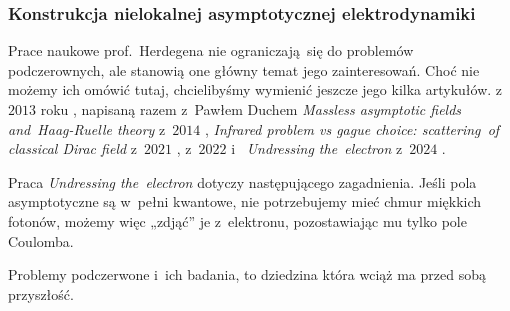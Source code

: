 \documentclass[10pt,t]{beamer}
\begin{document}
\begin{frame}
  \frametitle{Konstrukcja nielokalnej asymptotycznej
    elektrodynamiki}





  Prace naukowe prof.~Herdegena nie ograniczają~się do problemów
  podczerownych, ale stanowią one główny temat jego zainteresowań. Choć nie
  możemy ich omówić tutaj, chcielibyśmy wymienić jeszcze jego kilka
  artykułów.
   z~$2013$ roku
  \parencite{Herdegen-Infraparticle-Problem-Asymptotic-Fields-ETC-Pub-2013},
  napisaną razem z~Pawłem Duchem 
  {\textit{Massless asymptotic fields and~Haag-Ruelle theory}} z~$2014$
  \parencite{Duch-Herdegen-Massless-asymptotic-fields-and-ETC-Pub-2014},
  {\textit{Infrared problem vs gague choice: scattering~of classical Dirac
      field}} z~$2021$
  \parencite{Herdegen-Infrared-Problem-vs-Gauge-Choice-ETC-Ver-2021},
   z~$2022$
  \parencite{Herdegen-Almost-radial-gauge-ETC-Pub-2022}
  i~
  {\textit{Undressing the~electron}} z~$2024$
  \parencite{Herdegen-Undressing-the-electron-Pub-2024}.

  Praca 
  {\textit{Undressing the~electron}} dotyczy następującego zagadnienia.
  Jeśli pola asymptotyczne są w~pełni kwantowe, nie potrzebujemy mieć chmur
  miękkich fotonów, możemy więc „zdjąć” je z~elektronu, pozostawiając mu
  tylko pole Coulomba.

  Problemy podczerwone i~ich badania, to dziedzina która wciąż
  ma przed sobą przyszłość.

\end{frame}
\end{document}
